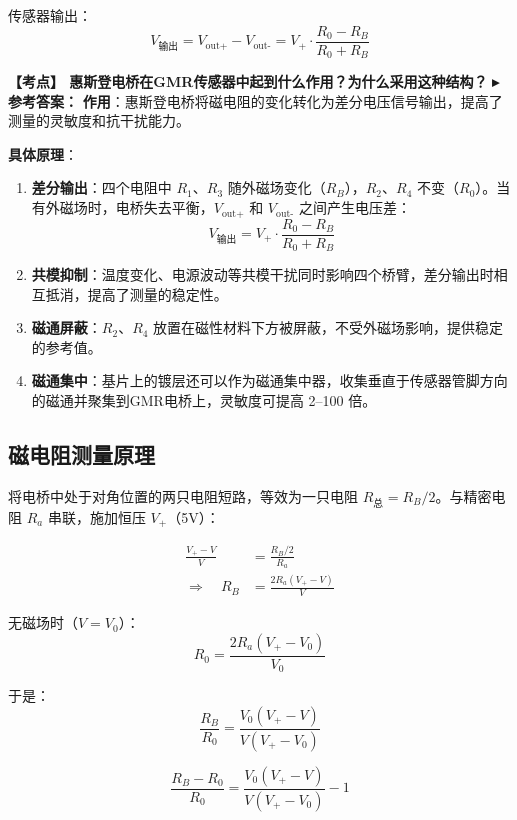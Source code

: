 \documentclass[12pt,a4paper]{article}
\newcommand{\boxeq}[1]{\begin{equation}\boxed{#1}\end{equation}}
\newcommand{\exam}[1]{\textbf{\color{blue!70!black}【考点】#1}}
\newcommand{\answer}[1]{\vspace{2pt}\noindent\textbf{\color{teal!80!black}▸ 参考答案：}#1\vspace{4pt}}
\newcommand{\qa}[2]{\exam{#1}\answer{#2}}
\begin{document}
传感器输出：
\begin{equation}
    V_{\text{输出}} = V_{\text{out+}} - V_{\text{out-}} = V_+ \cdot \frac{R_0 - R_B}{R_0 + R_B}
\end{equation}

\qa{
    惠斯登电桥在GMR传感器中起到什么作用？为什么采用这种结构？
}{
    \textbf{作用}：惠斯登电桥将磁电阻的变化转化为差分电压信号输出，提高了测量的灵敏度和抗干扰能力。

    \textbf{具体原理}：
    \begin{enumerate}
        \item \textbf{差分输出}：四个电阻中 $R_1$、$R_3$ 随外磁场变化（$R_B$），$R_2$、$R_4$ 不变（$R_0$）。当有外磁场时，电桥失去平衡，$V_{\text{out+}}$ 和 $V_{\text{out-}}$ 之间产生电压差：
        \[
        V_{\text{输出}} = V_+ \cdot \frac{R_0 - R_B}{R_0 + R_B}
        \]
        \item \textbf{共模抑制}：温度变化、电源波动等共模干扰同时影响四个桥臂，差分输出时相互抵消，提高了测量的稳定性。
        \item \textbf{磁通屏蔽}：$R_2$、$R_4$ 放置在磁性材料下方被屏蔽，不受外磁场影响，提供稳定的参考值。
        \item \textbf{磁通集中}：基片上的镀层还可以作为磁通集中器，收集垂直于传感器管脚方向的磁通并聚集到GMR电桥上，灵敏度可提高 2--100 倍。
    \end{enumerate}
}

\subsection{磁电阻测量原理}
将电桥中处于对角位置的两只电阻短路，等效为一只电阻 \(R_{\text{总}} = R_B/2\)。与精密电阻 \(R_a\) 串联，施加恒压 \(V_+\)（5V）：

\begin{align}
    \frac{V_+ - V}{V} &= \frac{R_B/2}{R_a} \\
    \Rightarrow\quad R_B &= \frac{2R_a (V_+ - V)}{V}
\end{align}

无磁场时（\(V = V_0\)）：
\begin{equation}
    R_0 = \frac{2R_a (V_+ - V_0)}{V_0}
\end{equation}

于是：
\boxeq{\frac{R_B}{R_0} = \frac{V_0 (V_+ - V)}{V (V_+ - V_0)}}

\boxeq{\frac{R_B - R_0}{R_0} = \frac{V_0 (V_+ - V)}{V (V_+ - V_0)} - 1}
\end{document}
